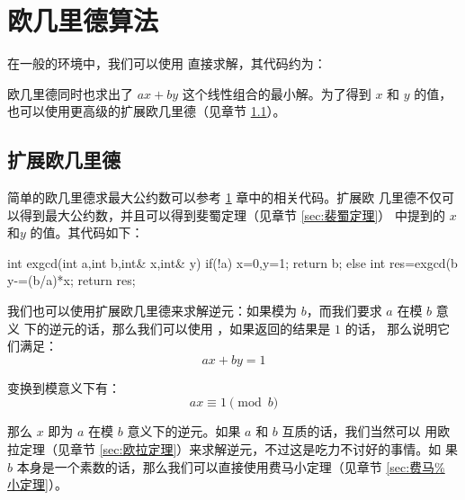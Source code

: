 \section{欧几里德算法}\label{sec:欧几里德算法}
在一般的环境中，我们可以使用  直接求解，其代码约为：

欧几里德同时也求出了 $ax + by$ 这个线性组合的最小解。为了得到 $x$ 和 $y$ 的值，
也可以使用更高级的扩展欧几里德（见章节 \ref{sec:扩展欧几里德}）。

\subsection{扩展欧几里德}\label{sec:扩展欧几里德}\label{subsec:扩展欧几里德}
简单的欧几里德求最大公约数可以参考 \ref{sec:欧几里德算法} 章中的相关代码。扩展欧
几里德不仅可以得到最大公约数，并且可以得到斐蜀定理（见章节 \ref{sec:裴蜀定理}）
中提到的 $x$ 和$y$ 的值。其代码如下：
\begin{Cpp}
int exgcd(int a,int b,int& x,int& y){
  if(!a){
    x=0,y=1;
    return b;
  }else{
    int res=exgcd(b%
    y-=(b/a)*x;
    return res;
  }
}
\end{Cpp}

我们也可以使用扩展欧几里德来求解逆元：如果模为 $b$，而我们要求 $a$ 在模 $b$ 意义
下的逆元的话，那么我们可以使用 ，如果返回的结果是 $1$ 的话，
那么说明它们满足：\[
    ax + by = 1
\]

变换到模意义下有：\[
    ax \equiv 1 \pmod b
\]

那么 $x$ 即为 $a$ 在模 $b$ 意义下的逆元。如果 $a$ 和 $b$ 互质的话，我们当然可以
用欧拉定理（见章节 \ref{sec:欧拉定理}）来求解逆元，不过这是吃力不讨好的事情。如
果 $b$ 本身是一个素数的话，那么我们可以直接使用费马小定理（见章节 \ref{sec:费马%
小定理}）。
